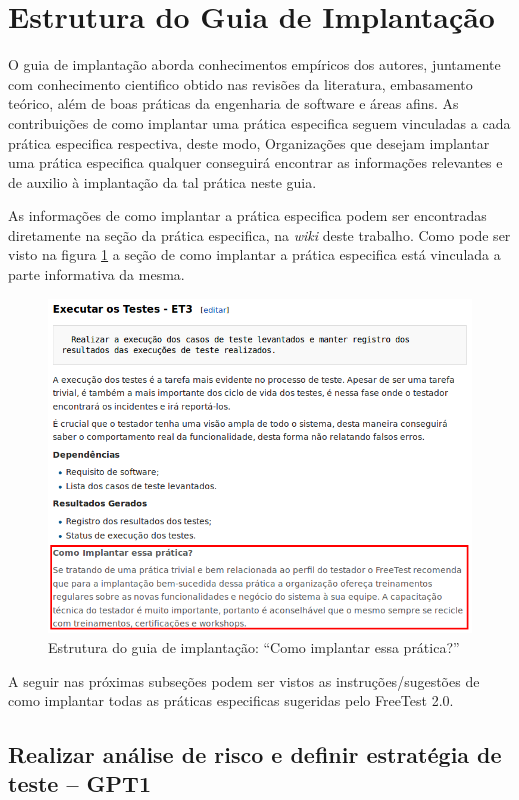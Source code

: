 \section{Estrutura do Guia de Implantação}
\label{sec:estruturaguiaimplantacao}

O guia de implantação aborda conhecimentos empíricos dos autores, juntamente com conhecimento cientifico obtido nas revisões da literatura, embasamento teórico, além de boas práticas da engenharia de software e áreas afins. As contribuições de como implantar uma prática especifica seguem vinculadas a cada prática especifica respectiva, deste modo, Organizações que desejam implantar uma prática especifica qualquer conseguirá encontrar as informações relevantes e de auxilio à implantação da tal prática neste guia.

As informações de como implantar a prática especifica podem ser encontradas diretamente na seção da prática especifica, na \textit{wiki} deste trabalho. Como pode ser visto na figura \ref{fig:fig51} a seção de como implantar a prática especifica está vinculada a parte informativa da mesma.

\begin{figure}[H]
\centering
\includegraphics[width=.90\textwidth]{fig/figura51.png}
\caption{Estrutura do guia de implantação: “Como implantar essa prática?”}
\label{fig:fig51}
\end{figure}

A seguir nas próximas subseções podem ser vistos as instruções/sugestões de como implantar todas as práticas especificas sugeridas pelo FreeTest 2.0.

\subsection{Realizar análise de risco e definir estratégia de teste – GPT1}
\label{sec:guiagpt1}

